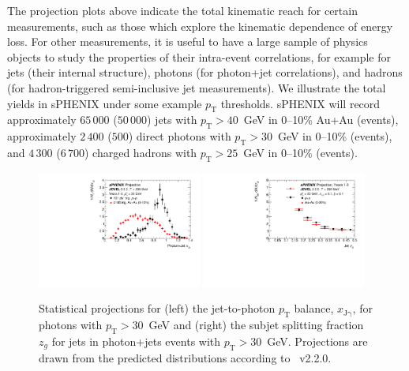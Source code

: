The projection plots above indicate the total kinematic reach for
certain measurements, such as those which explore the kinematic
dependence of energy loss.  For other measurements, it is useful to
have a large sample of physics objects to study the properties of
their intra-event correlations, for example for jets (their internal
structure), photons (for photon+jet correlations), and hadrons (for
hadron-triggered semi-inclusive jet measurements). We illustrate the
total yields in sPHENIX under some example $p_\mathrm{T}$
thresholds. sPHENIX will record approximately $65\,000$ ($50\,000$)
jets with $p_\mathrm{T} > 40$~GeV in 0--10\% Au+Au (\pp events),
approximately $2\,400$ ($500$) direct photons with
$p_\mathrm{T} > 30$~GeV in 0--10\% \auau (\pp events), and
$4\,300$ ($6\,700$) charged hadrons with $p_\mathrm{T} > 25$~GeV in
0--10\% \auau (\pp events).

\begin{figure}[h]
\centering
\includegraphics[width=0.48\textwidth]{figs/xJg_1.pdf}
\includegraphics[width=0.48\textwidth]{figs/zg_1.pdf}
\caption{Statistical projections for (left) the jet-to-photon
  $p_\mathrm{T}$ balance, $x_\mathrm{J\gamma}$, for photons with
  $p_\mathrm{T} > 30$~GeV and (right) the subjet splitting fraction
  $z_g$ for jets in photon+jets events with $p_\mathrm{T} >
  30$~GeV. Projections are drawn from the predicted distributions
  according to \jewel~v2.2.0.}
\label{fig:jet_JEWEL_proj}
\end{figure}

